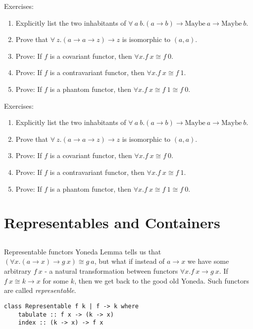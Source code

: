 \documentclass[tikz]{beamer}
\theoremstyle{definition}
\begin{document}
\begin{frame}[fragile]
Exercises:
\begin{enumerate}
    \item Explicitly list the two inhabitants of $\forall~a~b. (a \to b) \to \text{Maybe}~a \to \text{Maybe}~b$.
    \item Prove that $\forall~z. (a \to a \to z) \to z$ is isomorphic to $(a, a)$.
    \item Prove: If $f$ is a covariant functor, then $\forall x. f~x \cong f~0$.
    \item Prove: If $f$ is a contravariant functor, then $\forall x. f~x \cong f~1$.
    \item Prove: If $f$ is a phantom functor, then $\forall x. f~x \cong f~1 \cong f~0$.
\end{enumerate}
\end{frame}

\begin{frame}[fragile]
Exercises:
\begin{enumerate}
    \item Explicitly list the two inhabitants of $\forall~a~b. (a \to b) \to \text{Maybe}~a \to \text{Maybe}~b$.
    \item Prove that $\forall~z. (a \to a \to z) \to z$ is isomorphic to $(a, a)$.
    \item Prove: If $f$ is a covariant functor, then $\forall x. f~x \cong f~0$.
    \item Prove: If $f$ is a contravariant functor, then $\forall x. f~x \cong f~1$.
    \item Prove: If $f$ is a phantom functor, then $\forall x. f~x \cong f~1 \cong f~0$.
\end{enumerate}
\end{frame}

\section{Representables and Containers}
\subsection{}

\begin{frame}[fragile]{Representable functors}
Yoneda Lemma tells us that $(\forall x. (a \to x) \to g~x) \cong g~a$, but what if instead of $a \to x$ we have some arbitrary $f~x$ - a natural transformation between functors $\forall x. f~x \to g~x$.
\newline\newline
If $f~x \cong k \to x$ for some $k$, then we get back to the good old Yoneda. Such functors are called {\em representable}.

\begin{verbatim}
class Representable f k | f -> k where
    tabulate :: f x -> (k -> x)
    index :: (k -> x) -> f x
\end{verbatim}
\end{frame}
\end{document}
